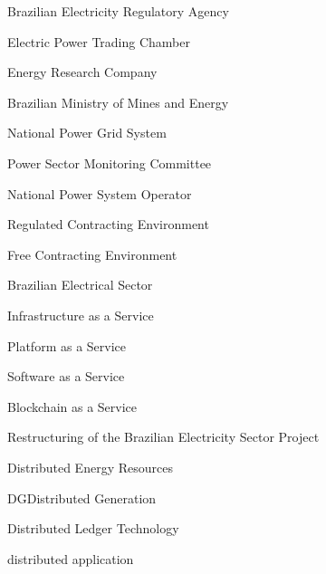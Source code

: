 {Brazilian Electricity Regulatory Agency}

{Electric Power Trading Chamber}

{Energy Research Company}

{Brazilian Ministry of Mines and Energy}

{National Power Grid System}

{Power Sector Monitoring Committee}

{National Power System Operator}

{Regulated Contracting Environment}

{Free Contracting Environment}

{Brazilian Electrical Sector}

{Infrastructure as a Service}

{Platform as a Service}

{Software as a Service}

{Blockchain as a Service}

{Restructuring of the Brazilian Electricity Sector Project}

{Distributed Energy Resources}

{DG}{Distributed Generation}

{Distributed Ledger Technology}

{distributed application}

